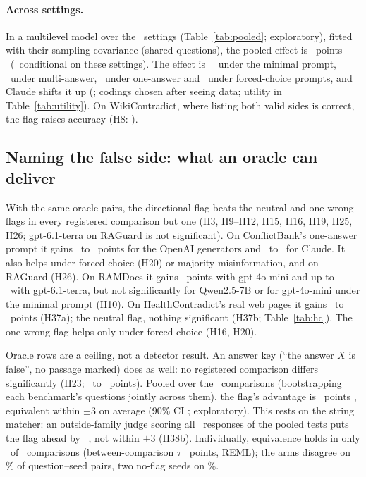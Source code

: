\paragraph{Across settings.} In a multilevel model over the \neuMlK\ settings (Table~\ref{tab:pooled}; exploratory),
fitted with their sampling covariance (shared questions), the pooled effect is \neuMlMu\ points
\neuMlCI\ (\neuMlCIDesign\ conditional on these settings). The effect is
\neuPolMinimal\ \neuPolMinimalCI\ under the minimal prompt, \neuPolMulti\ under
multi-answer, \neuPolSingle\ under one-answer and \neuPolForced\ under forced-choice prompts, and Claude
shifts it up (\neuMlAnthropic; codings chosen after seeing data; utility in Table~\ref{tab:utility}). On WikiContradict, where listing both valid sides is
correct, the flag raises accuracy (H8: \wikiOracleFlag).

\subsection{Naming the false side: what an oracle can deliver}
\label{sec:direction}
With the same oracle pairs, the directional flag beats the neutral and one-wrong flags in every registered comparison
but one (H3, H9--H12, H15, H16, H19, H25, H26; gpt-6.1-terra on RAGuard is not significant). On ConflictBank's
one-answer prompt it gains \azSgTerraOracleFlagDirectionalConflict\ to \azSgLunaOracleFlagDirectionalConflict\
points for the OpenAI generators and \azSgSonnetOracleFlagDirectionalConflict\ to
\azSgHaikuOracleFlagDirectionalConflict\ for Claude. It also helps under forced choice (H20) or majority
misinformation, and on RAGuard (H26). On RAMDocs it gains \adOracleDirConf\ points with gpt-4o-mini and
up to \azRdTerraOracleFlagDirectionalConflict\ with gpt-6.1-terra, but not significantly for Qwen2.5-7B or for
gpt-4o-mini under the minimal prompt (H10). On HealthContradict's real web pages it gains \hcDirMini\ to \hcDirHaiku\
points (H37a); the neutral flag, nothing significant (H37b; Table~\ref{tab:hc}). The
one-wrong flag helps only under forced choice (H16, H20).

Oracle rows are a ceiling, not a detector result. An answer key (``the answer $X$ is false'', no passage
marked) does as well: no registered comparison differs significantly (H23; \keyDiffMin\ to \keyDiffMax\ points).
Pooled over the \PoolTwentyThreeK\ comparisons (bootstrapping each benchmark's questions
jointly across them), the flag's advantage is \PoolTwentyThree\ points \PoolTwentyThreeCI, equivalent within $\pm$3 on average
(90\% CI \PoolTwentyThreeCINinety; exploratory). This rests on the string matcher: an outside-family judge scoring all
\jdN\ responses of the pooled tests puts the flag ahead by \jdTwentyThreeJ\ \jdTwentyThreeJCI, not within $\pm$3
(H38b). Individually, equivalence holds in only \hTwentyThreeEqN\ of
\hTwentyThreeK\ comparisons (between-comparison $\tau$ \hTwentyThreeTau\ points, REML); the arms disagree on \agrTwentyThreeDisMatched\% of question--seed pairs, two no-flag seeds on \agrTwentyThreeNull\%.

